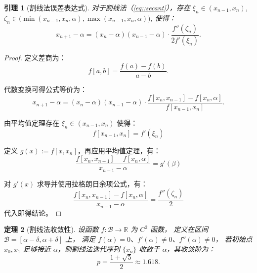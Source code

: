 \documentclass[a4paper]{ctexart}
\newtheorem{theorem}{定理}
\newtheorem{lemma}[theorem]{引理}
\numberwithin{theorem}{section}
\numberwithin{equation}{section}
\numberwithin{figure}{section}
\numberwithin{remark}{section}
\begin{document}
\begin{lemma}[割线法误差表达式]
    \label{lem::secant_error}
对于割线法（\ref{eq::secant}），存在 \( \xi_n \in (x_{n-1}, x_n) \), 
\( \zeta_n \in \big( \min(x_{n-1}, x_n, \alpha), \max(x_{n-1}, x_n, \alpha) \big) \), 使得：
\begin{equation}
x_{n+1} - \alpha = (x_n - \alpha)(x_{n-1} - \alpha) \cdot \frac{f''(\zeta_n)}{2 f'(\xi_n)}.
\end{equation}
\end{lemma}

\begin{proof}
定义差商为：
\begin{equation}
f[a,b] = \frac{f(a) - f(b)}{a - b}.
\end{equation}

代数变换可得公式等价为：
\begin{equation}
x_{n+1} - \alpha = (x_n - \alpha)(x_{n-1} - \alpha) \cdot \frac{f[x_n, x_{n-1}] - f[x_n, \alpha]}{f[x_{n-1}, x_n]}.
\end{equation}

由平均值定理存在 \( \xi_n \in (x_{n-1}, x_n) \) 使得：
\begin{equation}
f[x_{n-1}, x_n] = f'(\xi_n)
\end{equation}

定义 \( g(x) := f[x, x_n] \)，再应用平均值定理，有：
\begin{equation}
\frac{f[x_n, x_{n-1}] - f[x_n, \alpha]}{x_{n-1} - \alpha} = g'(\beta)
\end{equation}

对 \( g'(x) \) 求导并使用拉格朗日余项公式，有：
\begin{equation}
\frac{f[x_n, x_{n-1}] - f[x_n, \alpha]}{x_{n-1} - \alpha} = \frac{f''(\zeta_n)}{2}
\end{equation}
代入即得结论。
\end{proof}

\begin{theorem}[割线法收敛性]
    \label{thm::secant}
设函数 \( f : \mathcal{B} \to \mathbb{R} \) 为 \( C^2 \) 函数，
定义在区间 \( \mathcal{B} = [\alpha - \delta, \alpha + \delta] \) 上，
满足 \( f(\alpha) = 0 \)、\( f'(\alpha) \ne 0 \)、\( f''(\alpha) \ne 0 \)，
若初始点 \( x_0, x_1 \) 足够接近 \(\alpha\)，则割线法迭代序列 \( \{x_n\} \) 收敛于 \(\alpha\)，其收敛阶为：
\begin{equation*}
    \label{eq::golden_ratio}
p = \frac{1 + \sqrt{5}}{2} \approx 1.618.
\end{equation*}
\end{theorem}
\end{document}
